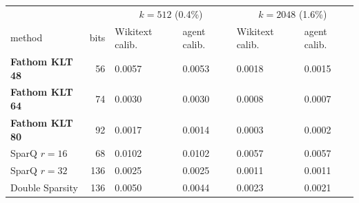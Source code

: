 \begin{tabular}{lrllll}
\toprule
 & & \multicolumn{2}{c}{$k{=}512$ (0.4\%)} & \multicolumn{2}{c}{$k{=}2048$ (1.6\%)} \\
method & bits & Wikitext calib. & agent calib. & Wikitext calib. & agent calib. \\
\midrule
\textbf{Fathom KLT 48} & 56 & 0.0057 & 0.0053 & 0.0018 & 0.0015 \\
\textbf{Fathom KLT 64} & 74 & 0.0030 & 0.0030 & 0.0008 & 0.0007 \\
\textbf{Fathom KLT 80} & 92 & 0.0017 & 0.0014 & 0.0003 & 0.0002 \\
SparQ $r{=}16$ & 68 & 0.0102 & 0.0102 & 0.0057 & 0.0057 \\
SparQ $r{=}32$ & 136 & 0.0025 & 0.0025 & 0.0011 & 0.0011 \\
Double Sparsity & 136 & 0.0050 & 0.0044 & 0.0023 & 0.0021 \\
\bottomrule
\end{tabular}